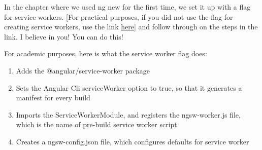 In the chapter where we used ng new for the first time, we set it up with a flag
for service workers. [For practical purposes, if you did not use the flag for
creating service workers, use the link \href{https://angular.io/guide/service-worker-getting-started}{here}]
and follow through on the steps in the link. I believe in you! You can do this!

For academic purposes, here is what the service worker flag does:
\begin{enumerate}
  \item Adds the @angular/service-worker package
  \item Sets the Angular Cli serviceWorker option to true, so that it generates
  a manifest for every build
  \item Imports the ServiceWorkerModule, and registers the ngsw-worker.js file,
  which is the name of pre-build service worker script
  \item Creates a ngsw-config.json file, which configures defaults for service
  worker
\end{enumerate}
